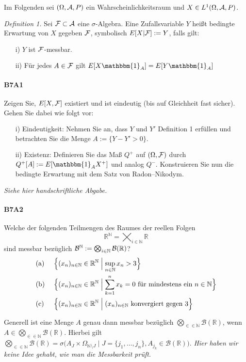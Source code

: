 \documentclass{article}
\begin{document}
Im Folgenden sei $(\Omega,{\cal A},P)$ ein Wahrscheinlichkeitsraum und $X\in L^1(\Omega,{\cal A},P)$.

\emph{Definition 1.} Sei ${\cal F}\subset{\cal A}$ eine $\sigma$-Algebra.
Eine Zufallsvariable $Y$ heißt bedingte Erwartung von $X$ gegeben ${\cal F}$, symbolisch $E[X|{\cal F}]:=Y$, falls gilt:
\begin{itemize}
\item[i)] $Y$ ist ${\cal F}$-messbar.
\item[ii)] Für jedes $A\in{\cal F}$ gilt $E[X\mathbbm{1}_A]=E[Y\mathbbm{1}_A]$
\end{itemize}
\paragraph{B7A1}
Zeigen Sie, $E[X,{\cal F}]$ existiert und ist eindeutig (bis auf Gleichheit fast sicher).
Gehen Sie dabei wie folgt vor:
\begin{itemize}
\item[i)] Eindeutigkeit: Nehmen Sie an, dass $Y$ und $Y'$ Definition 1 erfüllen und betrachten Sie die Menge $A:=\{Y-Y'>0\}$.
\item[ii)] Existenz: Definieren Sie das Maß $Q^+$ auf $(\Omega,{\cal F})$ durch $Q^+[A]:=E[\mathbbm{1}_AX^+]$ und analog $Q^-$.
  Konstruieren Sie nun die bedingte Erwartung mit dem Satz von Radon--Nikodym.
\end{itemize}
\emph{Siehe hier handschriftliche Abgabe.}
\newpage

\paragraph{B7A2}
Welche der folgenden Teilmengen des Raumes der reellen Folgen
\[
\mathbb{R}^\mathbb{N}=\bigtimes_{i\in\mathbb{N}}\mathbb{R}
\]
sind messbar bezüglich ${\cal B}^\mathbb{N}:=\bigotimes_{i\in\mathbb{N}}{\cal B}(\mathbb{R})$?
\begin{alignat*}{2}
  &\text{(a)}~&&\Bigl\{(x_n)_{n\in\mathbb{N}}\in\mathbb{R}^{\mathbb{N}}\Bigm|\sup_{n\in\mathbb{N}}x_n>3\Bigr\}\\
  &\text{(b)}~&&\Bigl\{(x_n)_{n\in\mathbb{N}}\in\mathbb{R}^{\mathbb{N}}\Bigm|\sum_{k=1}^nx_k=0\text{ für mindestens ein $n\in\mathbb{N}$}\Bigr\}\\
  &\text{(c)}~&&\Bigl\{(x_n)_{n\in\mathbb{N}}\in\mathbb{R}^{\mathbb{N}}\Bigm|(x_n)_{n\in\mathbb{N}}\text{ konvergiert gegen 3}\Bigr\}
\end{alignat*}

Generell ist eine Menge $A$ genau dann messbar bezüglich $\bigotimes_{\in\in\mathbb{N}}\mathcal{B}(\mathbb{R})$, wenn $A\in\bigotimes_{\in\in\mathbb{N}}\mathcal{B}(\mathbb{R})$.
Hierbei gilt $\bigotimes_{\in\in\mathbb{N}}\mathcal{B}(\mathbb{R})=\sigma\bigl(A_J\times\Omega_{\mathbb{N}\setminus J}\mid J=\{j_1,\dots,j_n\},A_{j_k}\in\mathcal{B}(\mathbb{R})\bigr)$.
\emph{Hier haben wir keine Idee gehabt, wie man die Messbarkeit prüft.}
\newpage
\end{document}
